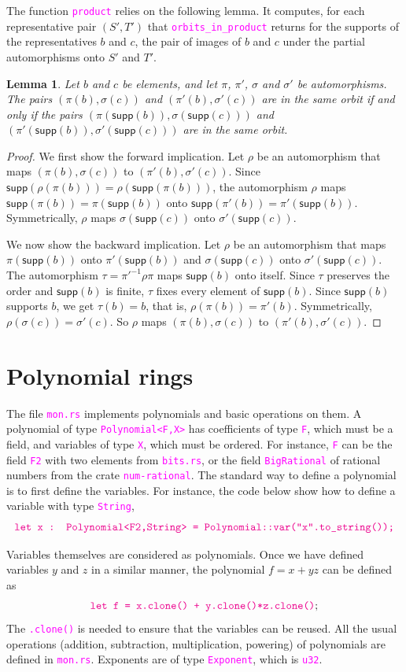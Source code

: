 \documentclass[12pt,a4paper,article]{memoir}
\newcommand{\arka}[1]{}
\newcommand{\code}[1]{\texttt{\textcolor{magenta}{#1}}}
\newtheorem{lemma}[theorem]{Lemma}
\theoremstyle{definition}
\begin{document}
The function \code{product} relies on the following lemma.
It computes, for each representative pair $(S',T')$ that \code{orbits\_in\_product} returns for the supports of the representatives $b$ and $c$,
the pair of images of $b$ and $c$ under the partial automorphisms onto $S'$ and $T'$.
%
\begin{lemma}\label{lem:product}
Let $b$ and $c$ be elements, and let $\pi$, $\pi'$, $\sigma$ and $\sigma'$ be automorphisms.
The pairs $(\pi(b),\sigma(c))$ and $(\pi'(b),\sigma'(c))$ are in the same orbit
if and only if the pairs $(\pi(\mathsf{supp}(b)),\sigma(\mathsf{supp}(c)))$ and $(\pi'(\mathsf{supp}(b)),\sigma'(\mathsf{supp}(c)))$ are in the same orbit.
\end{lemma}
\begin{proof}
We first show the forward implication.
Let $\rho$ be an automorphism that maps $(\pi(b),\sigma(c))$ to $(\pi'(b),\sigma'(c))$.
Since $\mathsf{supp}(\rho(\pi(b))) = \rho(\mathsf{supp}(\pi(b)))$,
the automorphism $\rho$ maps $\mathsf{supp}(\pi(b)) = \pi(\mathsf{supp}(b))$ onto $\mathsf{supp}(\pi'(b)) = \pi'(\mathsf{supp}(b))$.
Symmetrically, $\rho$ maps $\sigma(\mathsf{supp}(c))$ onto $\sigma'(\mathsf{supp}(c))$.

We now show the backward implication.
Let $\rho$ be an automorphism that maps $\pi(\mathsf{supp}(b))$ onto $\pi'(\mathsf{supp}(b))$ and $\sigma(\mathsf{supp}(c))$ onto $\sigma'(\mathsf{supp}(c))$.
The automorphism $\tau = \pi'^{-1}\rho\pi$ maps $\mathsf{supp}(b)$ onto itself.
Since $\tau$ preserves the order and $\mathsf{supp}(b)$ is finite,
$\tau$ fixes every element of $\mathsf{supp}(b)$.
Since $\mathsf{supp}(b)$ supports $b$, we get $\tau(b) = b$, that is, $\rho(\pi(b)) = \pi'(b)$.
Symmetrically, $\rho(\sigma(c)) = \sigma'(c)$.
So $\rho$ maps $(\pi(b),\sigma(c))$ to $(\pi'(b),\sigma'(c))$.
\end{proof}
%
\section{Polynomial rings}
%
The file \code{mon.rs} implements polynomials and basic operations on them.
A polynomial of type \code{Polynomial<F,X>} has coefficients of type \code{F},
which must be a field,
and variables of type \code{X}, which must be ordered.
For instance, \code{F} can be the field \code{F2} with two elements from \code{bits.rs},
or the field \code{BigRational} of rational numbers from the crate \code{num-rational}.
The standard way to define a polynomial is to first define the variables.
For instance, the code below show how to define a variable with type \code{String},
\[
\text{\code{let x : Polynomial<F2,String> = Polynomial::var("x".to\_string());}}
\]
\arka{this needs to clearer and more detailed}
Variables themselves are considered as polynomials.
Once we have defined variables $y$ and $z$ in a similar manner,
the polynomial $f = x + yz$ can be defined as
\[
\text{\code{let f = x.clone() + y.clone()*z.clone()}};
\] 
The \code{.clone()} is needed to ensure that the variables can be reused.
All the usual operations (addition, subtraction, multiplication, powering) of polynomials are defined in \code{mon.rs}.
Exponents are of type \code{Exponent}, which is \code{u32}.
\end{document}
